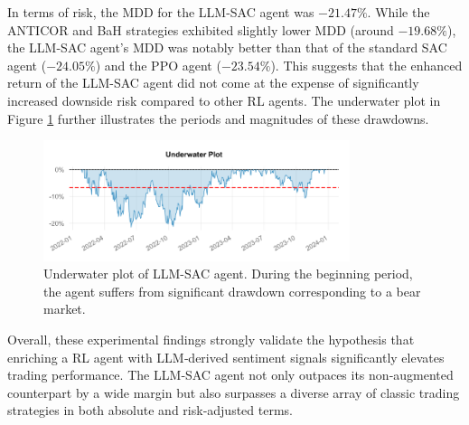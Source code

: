 In terms of risk, the \gls{MDD} for the LLM-SAC agent was \(-21.47\%\). While the \gls{ANTICOR} and \gls{BaH} strategies exhibited slightly lower \gls{MDD} (around \(-19.68\%\)), the LLM-SAC agent's \gls{MDD} was notably better than that of the standard SAC agent (\(-24.05\%\)) and the \gls{PPO} agent (\(-23.54\%\)). This suggests that the enhanced return of the LLM-SAC agent did not come at the expense of significantly increased downside risk compared to other RL agents. The underwater plot in Figure \ref{fig:underwater_plot} further illustrates the periods and magnitudes of these drawdowns.

\begin{figure}
  \centering
    \includegraphics[width=0.8\textwidth]{images/underwater_plot.png}
    \caption{Underwater plot of LLM-SAC agent. During the beginning period, the agent suffers from significant drawdown corresponding to a bear market.}
    \label{fig:underwater_plot}
\end{figure}

Overall, these experimental findings strongly validate the hypothesis that enriching a \gls{RL} agent with \gls{LLM}‑derived sentiment signals significantly elevates trading performance. The LLM‑SAC agent not only outpaces its non‑augmented counterpart by a wide margin but also surpasses a diverse array of classic trading strategies in both absolute and risk‑adjusted terms.
